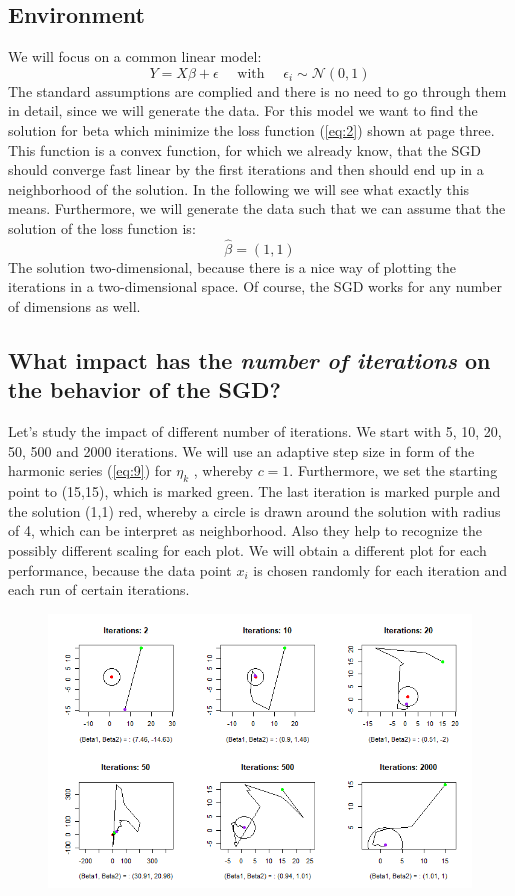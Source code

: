 \documentclass{article}
\begin{document}
\subsection{Environment}
We will focus on a common linear model:
$$ Y = X\beta + \epsilon  \quad \text{ with } \quad \epsilon_i \sim \mathcal{N}(0,1) $$
The standard assumptions are complied and there is no need to go through  them in detail, since we will generate the data. For this model we want to find the solution for beta which minimize the loss function (\ref{eq:2}) shown at page three. This function is a convex function, for which we already know, that the SGD should converge fast linear by the first iterations and then should end up in a neighborhood of the solution. In the following we will see what exactly this means.
\pagebreak 
Furthermore, we will generate the data such that we can assume that the solution of the loss function is: $$\hat{\beta} = (1,1) $$ The solution two-dimensional, because there is a nice way of plotting the iterations in a two-dimensional space. Of course, the SGD works for any number of dimensions as well.

\subsection{What impact has the \textit{number of iterations} on the behavior of the SGD?}
Let’s study the impact of different number of iterations. We start with 5, 10, 20, 50, 500 and 2000 iterations. We will use an adaptive step size in form of the harmonic series (\ref{eq:9}) for $ \eta_k $ , whereby $ c = 1 $. Furthermore, we set the starting point to (15,15), which is  marked green. The last iteration is marked purple and the solution (1,1) red, whereby a circle is drawn around the solution with radius of 4, which can be interpret as neighborhood. Also they help to recognize the possibly different scaling for each plot. We will obtain a different plot for each performance, because the data point $ x_i $ is chosen randomly for each iteration and each run of certain iterations.

\begin{figure}[h]
    \centering
    \includegraphics[width=\textwidth]{Iterations 2.png}
    \label{fig:mesh1}
\end{figure}
\end{document}
